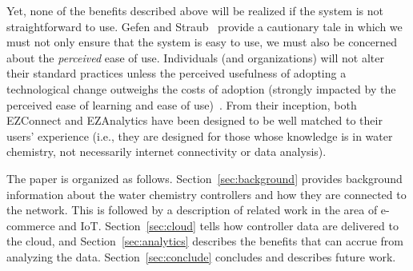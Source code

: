Yet, none of the benefits described above will be realized if
the system is not straightforward to use.
Gefen and Straub~\cite{gefen2000} provide a cautionary tale
in which we must not only ensure that the system is easy to use,
we must also be concerned about the \emph{perceived} ease of use.
Individuals (and organizations) will not alter their standard
practices unless the perceived usefulness of adopting a technological
change outweighs the costs of adoption (strongly impacted by
the perceived ease of learning and ease of use)~\cite{Davis89}.
From their inception, both EZConnect and EZAnalytics have been
designed to be well matched to their users' experience
(i.e., they are designed for those whose knowledge is in
water chemistry, not necessarily internet connectivity or data analysis).

The paper is organized as follows. Section~\ref{sec:background}
provides background information about the water chemistry controllers
and how they are connected to the network.  This is followed by a
description of related work in the area of e-commerce and IoT.
Section~\ref{sec:cloud} tells how controller data are delivered to
the cloud, and Section~\ref{sec:analytics} describes the benefits
that can accrue from analyzing the data.
Section~\ref{sec:conclude} concludes and describes future work.

